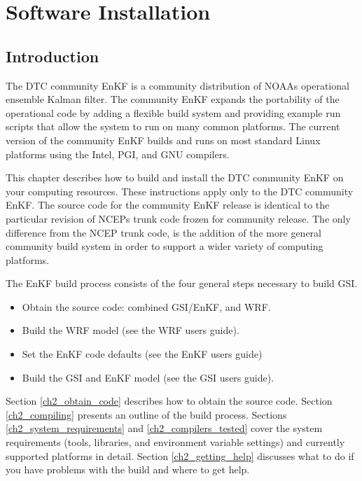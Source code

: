 \chapter{Software Installation}\label{enkf_install}
\setlength{\parskip}{12pt}

\section{Introduction}

The DTC community EnKF is a community distribution of NOAA\textquotesingle s operational ensemble Kalman filter. The community EnKF expands the portability of the operational code by adding a flexible build system and providing example run scripts that allow the system to run on many common platforms. The current version of the community EnKF builds and runs on most standard Linux platforms using the Intel, PGI, and GNU compilers.

This chapter describes how to build and install the DTC community EnKF on your computing resources. These instructions apply only to the DTC community EnKF. The source code for the community EnKF release is identical to the particular revision of NCEP\textquotesingle s trunk code frozen for community release. The only difference from the NCEP trunk code, is the addition of the more general community build system in order to support a wider variety of computing platforms.

The EnKF build process consists of the four general steps necessary to build GSI. 
\begin{itemize}
\item Obtain the source code: combined GSI/EnKF, and WRF.
\item Build the WRF model (see the WRF users guide).
\item Set the EnKF code defaults (see the EnKF users guide)
\item Build the GSI and EnKF model (see the GSI users guide).
\end{itemize}

Section \ref{ch2_obtain_code} describes how to obtain the source code. Section \ref{ch2_compiling} presents an outline of the build process. Sections \ref{ch2_system_requirements} and \ref{ch2_compilers_tested} cover the system requirements (tools, libraries, and environment variable settings) and currently supported platforms in detail. Section \ref{ch2_getting_help} discusses what to do if you have problems with the build and where to get help.

